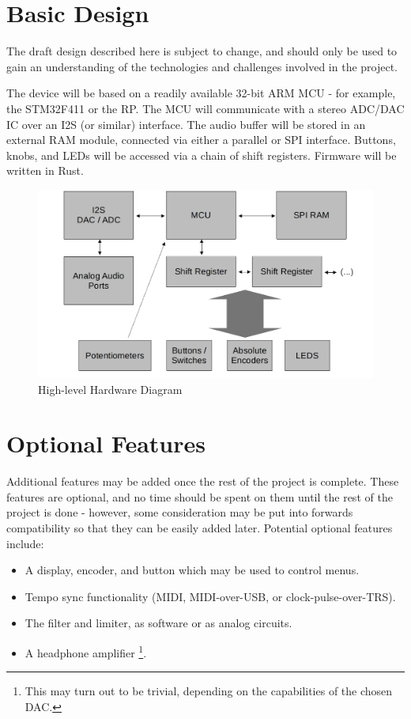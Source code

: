 \documentclass[12pt, letterpaper]{article}
\begin{document}
\section{Basic Design}
The draft design described here is subject to change, and should only be used to gain an understanding of the technologies and challenges involved in the project.
\par
The device will be based on a readily available 32-bit ARM MCU - for example, the STM32\-F411 or the RP. The MCU will communicate with a stereo ADC/DAC IC over an I2S (or similar) interface. The audio buffer will be stored in an external RAM module, connected via either a parallel or SPI interface. Buttons, knobs, and LEDs will be accessed via a chain of shift registers. Firmware will be written in Rust.
\begin{figure}[!ht]
  \centering
  \includegraphics[width=1.0\textwidth]{block_diagram}
  \caption{High-level Hardware Diagram}
  \label{fig:block_diagram}
\end{figure}


\section{Optional Features}
Additional features may be added once the rest of the project is complete. These features are optional, and no time should be spent on them until the rest of the project is done - however, some consideration may be put into forwards compatibility so that they can be easily added later. Potential optional features include:
\begin{itemize}
  \item A display, encoder, and button which may be used to control menus.
  \item Tempo sync functionality (MIDI, MIDI-over-USB, or clock-pulse-over-TRS).
  \item The filter and limiter, as software or as analog circuits.
  \item A headphone amplifier \footnote{This may turn out to be trivial, depending on the capabilities of the chosen DAC.}.
\end{itemize}
\end{document}
